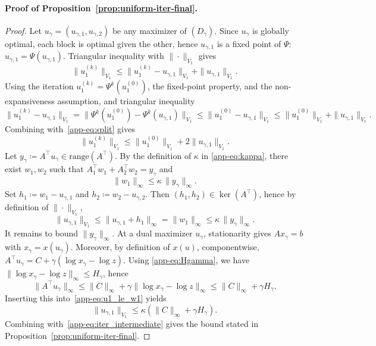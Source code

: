 \documentclass{article}
\theoremstyle{plain}
\newcommand{\norm}[1]{\|#1\|}
\newcommand{\norminf}[1]{\norm{#1}_\infty}
\newcommand{\z}{z}
\begin{document}
\paragraph{Proof of Proposition~\ref{prop:uniform-iter-final}.}
\begin{proof}
Let $u_\gamma=(u_{\gamma,1},u_{\gamma,2})$ be any maximizer of $(D_\gamma)$.
Since $u_\gamma$ is globally optimal, each block is optimal given the other, hence $u_{\gamma,1}$ is a fixed point of $\Psi$:
$u_{\gamma,1}=\Psi(u_{\gamma,1})$.
Triangular inequality with $\norm{\cdot}_{V_1}$ gives
\begin{equation}\label{app-eq:split}
\norm{u_1^{(k)}}_{V_1}\le \norm{u_1^{(k)}-u_{\gamma,1}}_{V_1}+\norm{u_{\gamma,1}}_{V_1}.
\end{equation}
Using the iteration $u_1^{(k)}=\Psi^k(u_1^{(0)})$, the fixed-point property, and the non-expansiveness assumption, and triangular inequality 
\[
	\norm{u_1^{(k)}-u_{\gamma,1}}_{V_1}
	=\norm{ \Psi^k(u_1^{(0)})-\Psi^k(u_{\gamma,1}) }_{V_1}
	\le \norm{ u_1^{(0)}-u_{\gamma,1} }_{V_1}
	\le \norm{u_1^{(0)}}_{V_1}+\norm{u_{\gamma,1}}_{V_1}.
\]
Combining with~\eqref{app-eq:split} gives
\begin{equation}\label{app-eq:iter_intermediate}
	\norm{u_1^{(k)}}_{V_1}\le \norm{u_1^{(0)}}_{V_1}+2\norm{u_{\gamma,1}}_{V_1}.
\end{equation}
Let $y_\gamma \coloneqq A^\top u_\gamma\in\mathrm{range}(A^\top)$.
By the definition of $\kappa$ in \eqref{app-eq:kappa}, there exist $w_1,w_2$ such that
$A_1^\top w_1+A_2^\top w_2=y_\gamma$ and
\begin{equation}\label{app-eq:w1_kappa}
\norminf{w_1}\le \kappa\,\norminf{y_\gamma}.
\end{equation}
Set $h_1 \coloneqq w_1-u_{\gamma,1}$ and $h_2 \coloneqq w_2-u_{\gamma,2}$. Then $(h_1,h_2)\in\ker(A^\top)$, hence by definition of $\|\cdot\|_{V_1}$,
\begin{equation}\label{app-eq:u1_le_w1}
\norm{ u_{\gamma,1} }_{V_1}\le \norminf{u_{\gamma,1}+h_1}=\norminf{w_1}\le \kappa\,\norminf{y_\gamma}.
\end{equation}
It remains to bound $\norminf{y_\gamma}$.
At a dual maximizer $u_\gamma$, stationarity gives $Ax_\gamma=b$ with $x_\gamma=x(u_\gamma)$.
Moreover, by definition of $x(u)$, componentwise,
$A^\top u_\gamma = C + \gamma (\log x_\gamma - \log \z)$.
%
Using \eqref{app-eq:Hgamma}, we have $\|\log x_\gamma - \log \z\|_\infty \le H_\gamma$, hence
\[
\norminf{A^\top u_\gamma}
\le \norm{C}_\infty + \gamma \norminf{\log x_\gamma - \log \z}
\le \norm{C}_\infty + \gamma H_\gamma.
\]
Inserting this into~\eqref{app-eq:u1_le_w1} yields
\[
\norm{ u_{\gamma,1} }_{V_1}\le \kappa\left(\norm{C}_\infty+\gamma H_\gamma\right).
\]
Combining with~\eqref{app-eq:iter_intermediate} gives the bound stated in Proposition~\ref{prop:uniform-iter-final}.
\end{proof}
\end{document}
